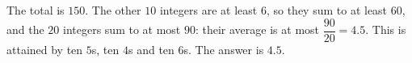 The total is $150$. The other $10$ integers are at least $6$, so they sum to at least $60$, and the $20$ integers sum to at most $90$: their average is at most $\dfrac{90}{20}=4.5$. This is attained by ten $5$s, ten $4$s and ten $6$s. The answer is $\boxed{4.5}$.
